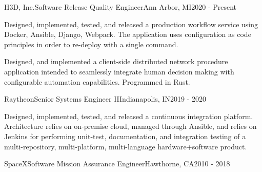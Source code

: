 



\begin{cventries}


  \cventry
  {H3D, Inc.}{Software Release Quality Engineer}{Ann Arbor, MI}{2020 - Present}
  {
    \begin{cvitems}
    \item Designed, implemented, tested, and released a production workflow service using
      Docker, Ansible, Django, Webpack. The application uses configuration as code principles in
      order to re-deploy with a single command.
    \item Designed, and implemented a client-side distributed network procedure application intended
      to seamlessly integrate human decision making with configurable automation
      capabilities. Programmed in Rust.
    \end{cvitems}
  }

  \cventry
  {Raytheon}{Senior Systems Engineer II}{Indianapolis, IN}{2019 - 2020}
  {
    \begin{cvitems}
    \item Designed, implemented, tested, and released a continuous integration
      platform. Architecture relies on on-premise cloud, managed through Ansible, and relies on
      Jenkins for performing unit-test, documentation, and integration testing of a
      multi-repository, multi-platform, multi-language hardware+software product.
    \end{cvitems}
  }

  \cventry
  {SpaceX}{Software Mission Assurance Engineer}{Hawthorne, CA}{2010 - 2018}
  {}


\end{cventries}
